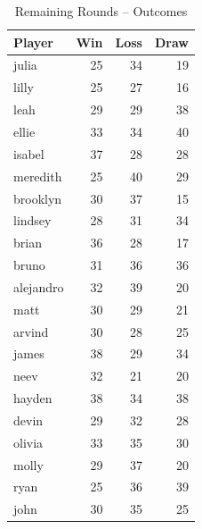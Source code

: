 \documentclass[12pt]{article}
\begin{document}
\begin{multicols}{2}
\begin{table}[H]
\centering
\caption{Remaining Rounds – Outcomes}
\label{tab:rest_outcomes}
\begin{tabular}{lrrr}
\toprule
\textbf{Player} & \textbf{Win} & \textbf{Loss} & \textbf{Draw} \\
\midrule
julia & 25 & 34 & 19 \\
lilly & 25 & 27 & 16 \\
leah & 29 & 29 & 38 \\
ellie & 33 & 34 & 40 \\
isabel & 37 & 28 & 28 \\
meredith & 25 & 40 & 29 \\
brooklyn & 30 & 37 & 15 \\
lindsey & 28 & 31 & 34 \\
brian & 36 & 28 & 17 \\
bruno & 31 & 36 & 36 \\
alejandro & 32 & 39 & 20 \\
matt & 30 & 29 & 21 \\
arvind & 30 & 28 & 25 \\
james & 38 & 29 & 34 \\
neev & 32 & 21 & 20 \\
hayden & 38 & 34 & 38 \\
devin & 29 & 32 & 28 \\
olivia & 33 & 35 & 30 \\
molly & 29 & 37 & 20 \\
ryan & 25 & 36 & 39 \\
john & 30 & 35 & 25 \\
\bottomrule
\end{tabular}
\end{table}


\end{multicols}
\end{document}
